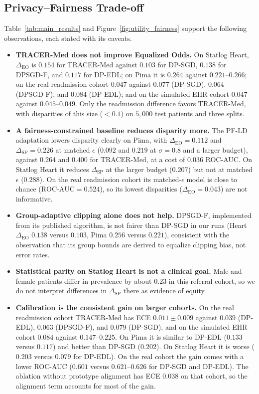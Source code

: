 \documentclass[pdflatex,sn-vancouver-num,referee,lineno]{sn-jnl}
\theoremstyle{thmstyleone}
\theoremstyle{thmstylethree}
\begin{document}
\subsection{Privacy--Fairness Trade-off}
Table~\ref{tab:main_results} and Figure~\ref{fig:utility_fairness} support the following observations, each stated with its caveats.
\begin{itemize}
    \item \textbf{TRACER-Med does not improve Equalized Odds.} On Statlog Heart, $\Delta_{\text{EO}}$ is $0.154$ for TRACER-Med against $0.103$ for DP-SGD, $0.138$ for DPSGD-F, and $0.117$ for DP-EDL; on Pima it is $0.264$ against $0.221$--$0.266$; on the real readmission cohort $0.047$ against $0.077$ (DP-SGD), $0.064$ (DPSGD-F), and $0.084$ (DP-EDL); and on the simulated EHR cohort $0.047$ against $0.045$--$0.049$. Only the readmission difference favors TRACER-Med, with disparities of this size ($<0.1$) on $5{,}000$ test patients and three splits.
    \item \textbf{A fairness-constrained baseline reduces disparity more.} The PF-LD adaptation lowers disparity clearly on Pima, with $\Delta_{\text{EO}} = 0.112$ and $\Delta_{\text{SP}} = 0.226$ at matched $\epsilon$ ($0.092$ and $0.219$ at $\sigma=0.8$ and a larger budget), against $0.264$ and $0.400$ for TRACER-Med, at a cost of $0.036$ ROC-AUC. On Statlog Heart it reduces $\Delta_{\text{SP}}$ at the larger budget ($0.207$) but not at matched $\epsilon$ ($0.288$). On the real readmission cohort its matched-$\epsilon$ model is close to chance ($\text{ROC-AUC}=0.524$), so its lowest disparities ($\Delta_{\text{EO}}=0.043$) are not informative.
    \item \textbf{Group-adaptive clipping alone does not help.} DPSGD-F, implemented from its published algorithm, is not fairer than DP-SGD in our runs (Heart $\Delta_{\text{EO}}$ $0.138$ versus $0.103$, Pima $0.256$ versus $0.221$), consistent with the observation that its group bounds are derived to equalize clipping bias, not error rates.
    \item \textbf{Statistical parity on Statlog Heart is not a clinical goal.} Male and female patients differ in prevalence by about $0.23$ in this referral cohort, so we do not interpret differences in $\Delta_{\text{SP}}$ there as evidence of equity.
    \item \textbf{Calibration is the consistent gain on larger cohorts.} On the real readmission cohort TRACER-Med has ECE $0.011 \pm 0.009$ against $0.039$ (DP-EDL), $0.063$ (DPSGD-F), and $0.079$ (DP-SGD), and on the simulated EHR cohort $0.084$ against $0.147$--$0.225$. On Pima it is similar to DP-EDL ($0.133$ versus $0.117$) and better than DP-SGD ($0.202$). On Statlog Heart it is worse ($0.203$ versus $0.079$ for DP-EDL). On the real cohort the gain comes with a lower ROC-AUC ($0.601$ versus $0.621$--$0.626$ for DP-SGD and DP-EDL). The ablation without prototype alignment has ECE $0.038$ on that cohort, so the alignment term accounts for most of the gain.
\end{itemize}
\end{document}
